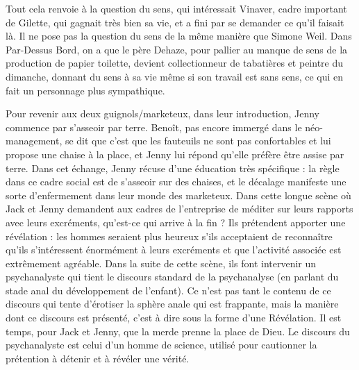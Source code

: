 \documentclass[a4paper,12pt]{book}
\begin{document}
\par Tout cela renvoie à la question du sens, qui intéressait Vinaver, cadre important de Gilette, qui gagnait très bien sa vie, et a fini par se demander ce qu'il faisait là. Il ne pose pas la question du sens de la même manière que Simone Weil. Dans Par-Dessus Bord, on a que le père Dehaze, pour pallier au manque de sens de la production de papier toilette, devient collectionneur de tabatières et peintre du dimanche, donnant du sens à sa vie même si son travail est sans sens, ce qui en fait un personnage plus sympathique.
\par Pour revenir aux deux guignols/marketeux, dans leur introduction, Jenny commence par s'asseoir par terre. Benoît, pas encore immergé dans le néo-management, se dit que c'est que les fauteuils ne sont pas confortables et lui propose une chaise à la place, et Jenny lui répond qu'elle préfère être assise par terre. Dans cet échange, Jenny récuse d'une éducation très spécifique : la règle dans ce cadre social est de s'asseoir sur des chaises, et le décalage manifeste une sorte d'enfermement dans leur monde des marketeux. Dans cette longue scène où Jack et Jenny demandent aux cadres de l'entreprise de méditer sur leurs rapports avec leurs excréments, qu'est-ce qui arrive à la fin ? Ils prétendent apporter une révélation : les hommes seraient plus heureux s'ils acceptaient de reconnaître qu'ils s'intéressent énormément à leurs excréments et que l'activité associée est extrêmement agréable. Dans la suite de cette scène, ils font intervenir un psychanalyste qui tient le discours standard de la psychanalyse (en parlant du stade anal du développement de l'enfant). Ce n'est pas tant le contenu de ce discours qui tente d'érotiser la sphère anale qui est frappante, mais la manière dont ce discours est présenté, c'est à dire sous la forme d'une Révélation. Il est temps, pour Jack et Jenny, que la merde prenne la place de Dieu. Le discours du psychanalyste est celui d'un homme de science, utilisé pour cautionner la prétention à détenir et à révéler une vérité.
\end{document}
